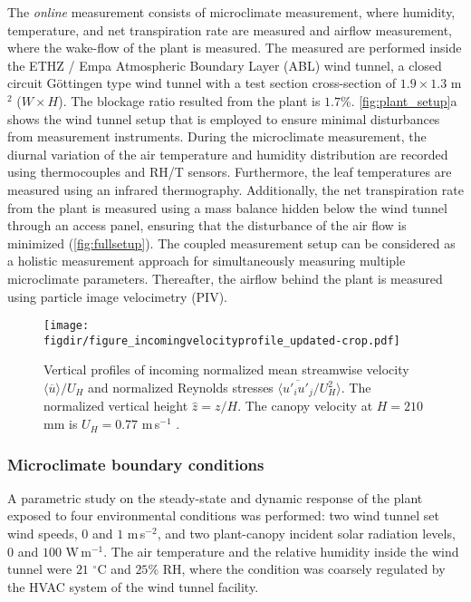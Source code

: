 The \textit{online} measurement consists of microclimate measurement, where humidity, temperature, and net transpiration rate are measured and airflow measurement, where the wake-flow of the plant is measured. The measured are performed inside the ETHZ / Empa Atmospheric Boundary Layer (ABL) wind tunnel, a closed circuit Göttingen type wind tunnel with a test section cross-section of $1.9\times1.3$ m$^2$ ($W\times H$). The blockage ratio resulted from the plant is $1.7$\%. \cref{fig:plant_setup}a shows the wind tunnel setup that is employed to ensure minimal disturbances from measurement instruments. During the microclimate measurement, the diurnal variation of the air temperature and humidity distribution are recorded using thermocouples and RH/T sensors. Furthermore, the leaf temperatures are measured using an infrared thermography. Additionally, the net transpiration rate from the plant is measured using a mass balance hidden below the wind tunnel through an access panel, ensuring that the disturbance of the air flow is minimized  (\cref{fig:fullsetup}). The coupled measurement setup can be considered as a holistic measurement approach for simultaneously measuring multiple microclimate parameters. Thereafter, the airflow behind the plant is measured using particle image velocimetry (PIV).
	
\begin{figure}[t]
	\centering
	\texttt{[image: \\figdir/figure\_incomingvelocityprofile\_updated-crop.pdf]}
	\caption{Vertical profiles of incoming  normalized mean streamwise velocity $\langle \overline{u} \rangle / U_H$ and  normalized Reynolds stresses $\langle \overline{u'_i u'_j}/U_H^2 \rangle$. The normalized vertical height  $\hat{z}=z/H$. The canopy velocity at $H=210$ mm is $U_H = 0.77$ m\,s$^{-1}$ \citep{Tsalicoglou2018}.}
	\label{fig:incomingvelocityprofile}
\end{figure}

\subsubsection*{Microclimate boundary conditions}
A parametric study on the steady-state and dynamic response of the plant exposed to four environmental conditions was performed: two wind tunnel set wind speeds, $0$ and $1$ m\,s$^{-2}$, and two plant-canopy incident solar radiation levels, $0$ and $100$ W\,m$^{-1}$. The air temperature and the relative humidity inside the wind tunnel were $21$ $^{\circ}$C and $25$\% RH, where the condition was coarsely regulated by the HVAC system of the wind tunnel facility. 

